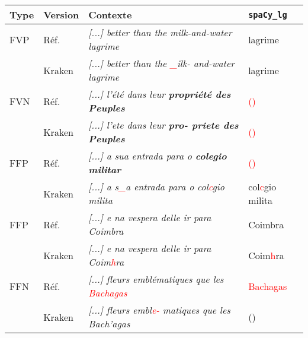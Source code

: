 
\scriptsize{
\begin{tabular}{|l|l|l|l|}
\hline
Type &Version & Contexte & \texttt{spaCy\_lg} \\
\hline
\hline
FVP&Réf. &\textit{[...] better than the milk-and-water lagrime}& lagrime\\
&Kraken &\textit{[...] better than the \textcolor{red}{\_}ilk-
and-water lagrime}& lagrime \\
\hline
FVN&Réf. & \textit{[...] l'été dans leur \textbf{propriété des Peuples}}& \textcolor{red}{()} \\
&Kraken &\textit{[...] l'ete dans leur \textbf{pro-
priete des Peuples}}& \textcolor{red}{()} \\
\hline
\hline
FFP &Réf. &\textit{[...] a sua entrada para o \textbf{colegio militar}}& \textcolor{red}{()} \\
&Kraken &\textit{[...] a s\textcolor{red}{\_}a entrada para
o col\textcolor{red}{c}gio milita}& col\textcolor{red}{c}gio milita \\
FFP &Réf. & \textit{[...] e na vespera delle ir para Coimbra}
&Coimbra \\
&Kraken & \textit{[...] e na vespera delle ir para Coim\textcolor{red}{h}ra} &Coim\textcolor{red}{h}ra \\
\hline
FFN&Réf. & \textit{[...] fleurs emblématiques que les \textcolor{red}{Bachagas}}& \textcolor{red}{Bachagas} \\
&Kraken & \textit{[...] fleurs embl\textcolor{red}{e-}
matiques que les Bach'agas}& () \\
\hline
\end{tabular}}


